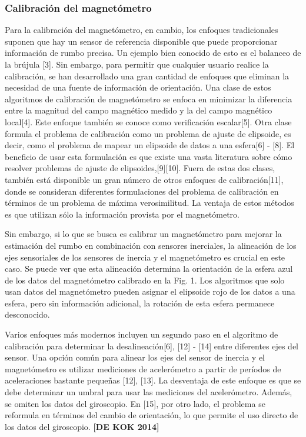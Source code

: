 \subsubsection{Calibración del magnetómetro}
Para la calibración del magnetómetro, en cambio, los enfoques tradicionales suponen que hay un sensor de referencia disponible que puede proporcionar información de rumbo precisa. Un ejemplo bien conocido de esto es el balanceo de la brújula [3]. Sin embargo, para permitir que cualquier usuario realice la calibración, se han desarrollado una gran cantidad de enfoques que eliminan la necesidad de una fuente de información de orientación. Una clase de estos algoritmos de calibración de magnetómetro se enfoca en minimizar la diferencia entre la magnitud del campo magnético medido y la del campo magnético local[4]. Este enfoque también se conoce como verificación escalar[5]. Otra clase formula el problema de calibración como un problema de ajuste de elipsoide, es decir, como el problema de mapear un elipsoide de datos a una esfera[6] - [8]. El beneficio de usar esta formulación es que existe una vasta literatura sobre cómo resolver problemas de ajuste de elipsoides,[9][10]. Fuera de estas dos clases, también está disponible un gran número de otros enfoques de calibración[11], donde se consideran diferentes formulaciones del problema de calibración en términos de un problema de máxima verosimilitud. La ventaja de estos métodos es que utilizan sólo la información provista por el magnetómetro.

Sin embargo, si lo que se busca es calibrar un magnetómetro para mejorar la estimación del rumbo en combinación con sensores inerciales, la alineación de los ejes sensoriales de los sensores de inercia y el magnetómetro es crucial en este caso. Se puede ver que esta alineación determina la orientación de la esfera azul de los datos del magnetómetro calibrado en la Fig. 1. Los algoritmos que solo usan datos del magnetómetro pueden asignar el elipsoide rojo de los datos a una esfera, pero sin información adicional, la rotación de esta esfera permanece desconocido.

Varios enfoques más modernos incluyen un segundo paso en el algoritmo de calibración para determinar la desalineación[6], [12] - [14] entre diferentes ejes del sensor. Una opción común para alinear los ejes del sensor de inercia y el magnetómetro es utilizar mediciones de acelerómetro a partir de períodos de aceleraciones bastante pequeñas [12], [13]. La desventaja de este enfoque es que se debe determinar un umbral para usar las mediciones del acelerómetro. Además, se omiten los datos del giroscopio. En [15], por otro lado, el problema se reformula en términos del cambio de orientación, lo que permite el uso directo de los datos del giroscopio. \textbf{[DE KOK 2014]}
\fi

